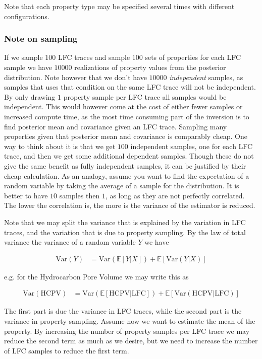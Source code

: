 \documentclass[note,screen,english,12pt,utf8]{nrdoc}
\begin{document}
Note that each property type may be specified several times with different configurations.

\subsubsection{Note on sampling}
\label{sec:sampling}

If we sample $100$ LFC traces and sample $100$ sets of properties for each
LFC sample we have $10000$ realizations of property values from the posterior distribution.
Note however that we don't have $10000$
\textit{independent} samples, as samples that uses that condition on the same LFC
trace will not be independent. By only drawing $1$ property sample per LFC trace
all samples would be independent. This would however come at the cost of either fewer
samples or increased compute time, as the most time consuming part of the inversion
is to find posterior mean and covariance given an LFC trace. Sampling many properties
given that posterior mean and covariance is comparably cheap. One way to think about
it is that we get $100$ independent samples, one for each LFC trace, and then we
get some additional dependent samples. Though these do not give the same benefit
as fully independent samples, it can be justified by their cheap calculation.
As an analogy, assume you want to find the expectation of a random variable by taking
the average of a sample for the distribution. It is better to have $10$ samples then
$1$, as long as they are not perfectly correlated. The lower the correlation is, the
more is the variance of the estimator is reduced.

Note that we may split the variance that is explained by the variation in LFC traces,
and the variation that is due to property sampling. By the law of total variance
the variance of a random variable $Y$ we have

\begin{align*}
\text{Var}(Y) &= \text{Var}(\mathbb{E}[Y | X]) + \mathbb{E}[\text{Var}(Y | X)]
\end{align*}

e.g. for the Hydrocarbon Pore Volume we may write this as

\begin{align*}
\text{Var}(\text{HCPV}) &= \text{Var}(\mathbb{E}[\text{HCPV} | \text{LFC}]) + \mathbb{E}[\text{Var}(\text{HCPV} | \text{LFC})]
\end{align*}

The first part is due the variance in LFC traces, while the second part
is the variance in property sampling. Assume now we want to estimate the
mean of the property. By increasing the number of property
samples per LFC trace we may reduce the second term as much as we desire,
but we need to increase the number of LFC samples to reduce the first term.
\end{document}
